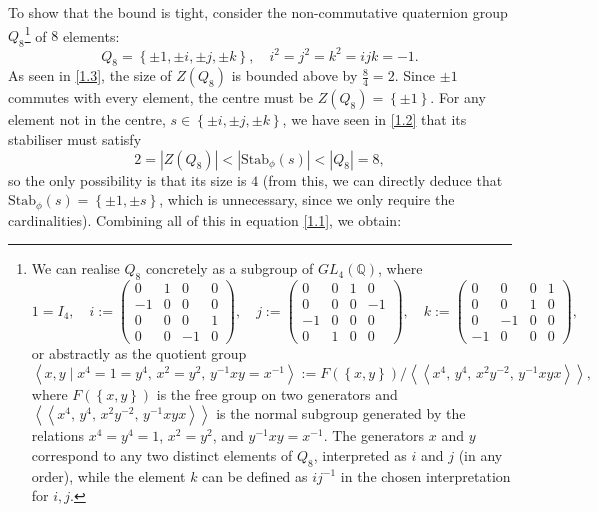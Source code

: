\documentclass[11pt, a4paper, oneside]{article}
\theoremstyle{remark}
\theoremstyle{lemma}
\begin{document}
To show that the bound is tight, consider the non-commutative quaternion group \( Q_8 \)\footnote{We can realise \( Q_8 \) concretely as a subgroup of \( GL_4\left( \mathbb{Q} \right) \), where
\[
1 = I_4, \quad
i := \begin{pmatrix}
0 & 1 & 0 & 0 \\
-1 & 0 & 0 & 0 \\
0 & 0 & 0 & 1 \\
0 & 0 & -1 & 0
\end{pmatrix}, \quad
j := \begin{pmatrix}
0 & 0 & 1 & 0 \\
0 & 0 & 0 & -1 \\
-1 & 0 & 0 & 0 \\
0 & 1 & 0 & 0
\end{pmatrix}, \quad
k := \begin{pmatrix}
0 & 0 & 0 & 1 \\
0 & 0 & 1 & 0 \\
0 & -1 & 0 & 0 \\
-1 & 0 & 0 & 0
\end{pmatrix},
\]
or abstractly as the quotient group
\[
\left\langle x, y \mid x^4 = 1 = y^4,\, x^2 = y^2,\, y^{-1} x y = x^{-1} \right\rangle := F\left( \left\{ x, y \right\} \right) / \left\langle\!\left\langle x^4,\, y^4,\, x^2 y^{-2},\, y^{-1} x y x \right\rangle\!\right\rangle,
\]
where \( F\left( \left\{ x, y \right\} \right) \) is the free group on two generators and \( \left\langle\!\left\langle x^4,\, y^4,\, x^2 y^{-2},\, y^{-1} x y x \right\rangle\!\right\rangle \) is the normal subgroup generated by the relations \( x^4 = y^4 = 1 \), \( x^2 = y^2 \), and \( y^{-1} x y = x^{-1} \). The generators \( x \) and \( y \) correspond to any two distinct elements of \( Q_8 \), interpreted as \( i \) and \( j \) (in any order), while the element \( k \) can be defined as \( i j^{-1} \) in the chosen interpretation for \( i, j \).} of \(8\) elements:
\[
Q_8 = \left\{ \pm 1, \pm i, \pm j, \pm k \right\}, \quad i^2 = j^2 = k^2 = ijk = -1.
\]
As seen in \eqref{1.3}, the size of \( Z\left( Q_8 \right) \) is bounded above by \( \frac{8}{4} = 2 \). Since \( \pm 1 \) commutes with every element, the centre must be \( Z\left( Q_8 \right) = \left\{ \pm 1 \right\} \). For any element not in the centre, \( s \in \left\{ \pm i, \pm j, \pm k \right\} \), we have seen in \eqref{1.2} that its stabiliser must satisfy
\[
2 = \left| Z\left( Q_8 \right) \right| < \left| \mathrm{Stab}_{\phi}\left( s \right) \right| < \left| Q_8 \right|=8,
\]
so the only possibility is that its size is \( 4 \) (from this, we can directly deduce that \(\mathrm{Stab}_{\phi}\left( s \right) = \left\{ \pm 1, \pm s \right\}\), which is unnecessary, since we only require the cardinalities). Combining all of this in equation \eqref{1.1}, we obtain:
\end{document}
